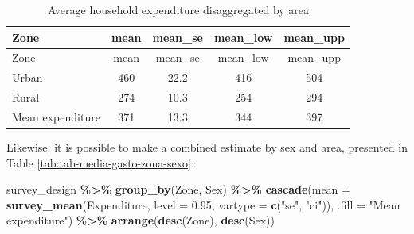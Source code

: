 \documentclass[
  english,
  12pt,
]{book}
\newenvironment{Shaded}{\begin{snugshade}}{\end{snugshade}}
\newcommand{\AttributeTok}[1]{\textcolor[rgb]{0.13,0.29,0.53}{#1}}
\newcommand{\FloatTok}[1]{\textcolor[rgb]{0.00,0.00,0.81}{#1}}
\newcommand{\FunctionTok}[1]{\textcolor[rgb]{0.13,0.29,0.53}{\textbf{#1}}}
\newcommand{\NormalTok}[1]{#1}
\newcommand{\SpecialCharTok}[1]{\textcolor[rgb]{0.81,0.36,0.00}{\textbf{#1}}}
\newcommand{\StringTok}[1]{\textcolor[rgb]{0.31,0.60,0.02}{#1}}
\begin{document}
\begin{longtable}[]{@{}lcccc@{}}
\caption{\label{tab:tab-media-gasto-zona}Average household expenditure disaggregated by area}\tabularnewline
\toprule\noalign{}
Zone & mean & mean\_se & mean\_low & mean\_upp \\
\midrule\noalign{}
\endfirsthead
\toprule\noalign{}
Zone & mean & mean\_se & mean\_low & mean\_upp \\
\midrule\noalign{}
\endhead
\bottomrule\noalign{}
\endlastfoot
Urban & 460 & 22.2 & 416 & 504 \\
Rural & 274 & 10.3 & 254 & 294 \\
Mean expenditure & 371 & 13.3 & 344 & 397 \\
\end{longtable}

Likewise, it is possible to make a combined estimate by sex and area, presented in Table \ref{tab:tab-media-gasto-zona-sexo}:

\begin{Shaded}
\begin{Highlighting}[]
\NormalTok{survey\_design }\SpecialCharTok{\%\textgreater{}\%}
  \FunctionTok{group\_by}\NormalTok{(Zone, Sex) }\SpecialCharTok{\%\textgreater{}\%}
  \FunctionTok{cascade}\NormalTok{(}\AttributeTok{mean =} \FunctionTok{survey\_mean}\NormalTok{(Expenditure,}
                              \AttributeTok{level =} \FloatTok{0.95}\NormalTok{,}
                              \AttributeTok{vartype =} \FunctionTok{c}\NormalTok{(}\StringTok{"se"}\NormalTok{, }\StringTok{"ci"}\NormalTok{)),}
        \AttributeTok{.fill =} \StringTok{"Mean expenditure"}\NormalTok{) }\SpecialCharTok{\%\textgreater{}\%}
  \FunctionTok{arrange}\NormalTok{(}\FunctionTok{desc}\NormalTok{(Zone), }\FunctionTok{desc}\NormalTok{(Sex))}
\end{Highlighting}
\end{Shaded}
\end{document}
